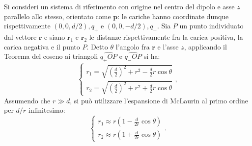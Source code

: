 \documentclass[a4paper,11pt]{report}
\begin{document}
Si consideri un sistema di riferimento con origine nel centro del dipolo e asse $z$ parallelo allo stesso, orientato come $\bm{p}$: le cariche hanno coordinate dunque rispettivamente $(0,0,d/2), q_+$ e $(0,0,-d/2), q_-$. Sia $P$ un punto individuato dal vettore $\bm{r}$ e siano $\bm{r}_1$ e $\bm{r}_2$ le distanze rispettivamente fra la carica positiva, la carica negativa e il punto $P$. Detto $\theta$ l'angolo fra $\bm{r}$ e l'asse $z$, applicando il Teorema del coseno ai triangoli $\widehat{q_+OP}$ e $\widehat{q_-OP}$  si ha:
\begin{equation}
\begin{cases}
    r_1 =\sqrt{ \left(\frac{d}{2}\right)^2 + r^2 - \frac{d}{2}r\cos\theta}  \\
    r_2 = \sqrt{\left(\frac{d}{2}\right)^2 + r^2 + \frac{d}{2}r\cos\theta} 
\end{cases}
,
\end{equation}
Assumendo che $r \gg d$, si può utilizzare l'espansione di McLaurin al primo ordine per $d/r$ infinitesimo: 
\begin{equation}
\begin{cases}
    r_1 \approx r\left(1-\frac{d}{2r}\cos \theta \right) \\
    r_2  \approx r\left(1+\frac{d}{2r}\cos \theta \right)
\end{cases}
.
\end{equation}
\end{document}
